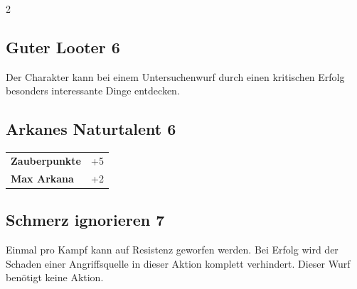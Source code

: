 \begin{multicols}{2}
\begin{tcolorbox}

\end{tcolorbox}

\begin{tcolorbox}
    \subsection*{Guter Looter \hfill \small{6 }}
    \tcblower
Der Charakter kann bei einem Untersuchenwurf durch einen kritischen Erfolg besonders interessante  Dinge entdecken.


\vspace{3mm}



\end{tcolorbox}

\begin{tcolorbox}
    \subsection*{Arkanes Naturtalent \hfill \small{6 }}
    \tcblower




\begin{tabular}{@{}ll@{}}
    \textbf{Zauberpunkte} & +5\\
    \textbf{Max Arkana} & +2\\
\end{tabular}


\end{tcolorbox}

\begin{tcolorbox}
    \subsection*{Schmerz ignorieren \hfill \small{7 }}
    \tcblower
Einmal pro Kampf kann auf Resistenz geworfen werden. Bei Erfolg wird der Schaden einer Angriffsquelle in dieser Aktion komplett verhindert. Dieser Wurf benötigt keine Aktion.



\end{tcolorbox}
\end{multicols}
